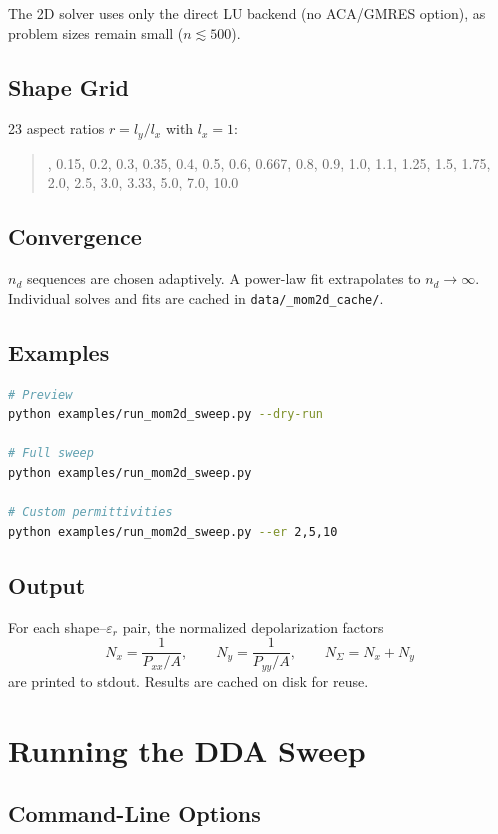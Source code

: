 \documentclass[a4paper,11pt]{article}
\begin{document}
The 2D solver uses only the direct LU backend (no ACA/GMRES option), as
problem sizes remain small ($n \lesssim 500$).

\subsection{Shape Grid}

23 aspect ratios $r = l_y / l_x$ with $l_x = 1$:
%
\begin{quote}
, 0.15, 0.2, 0.3, 0.35, 0.4, 0.5, 0.6, 0.667, 0.8, 0.9,
1.0, 1.1, 1.25, 1.5, 1.75, 2.0, 2.5, 3.0, 3.33, 5.0, 7.0, 10.0
\end{quote}

\subsection{Convergence}

$n_d$ sequences are chosen adaptively.  A power-law fit extrapolates to
$n_d \to \infty$.  Individual solves and fits are cached in
\texttt{data/\_mom2d\_cache/}.

\subsection{Examples}

\begin{lstlisting}[language=bash]
# Preview
python examples/run_mom2d_sweep.py --dry-run

# Full sweep
python examples/run_mom2d_sweep.py

# Custom permittivities
python examples/run_mom2d_sweep.py --er 2,5,10
\end{lstlisting}

\subsection{Output}

For each shape--$\varepsilon_r$ pair, the normalized depolarization factors
\[
N_x = \frac{1}{P_{xx}/A}, \qquad
N_y = \frac{1}{P_{yy}/A}, \qquad
N_{\Sigma} = N_x + N_y
\]
are printed to stdout.  Results are cached on disk for reuse.

\section{Running the DDA Sweep}

\subsection{Command-Line Options}
\end{document}

